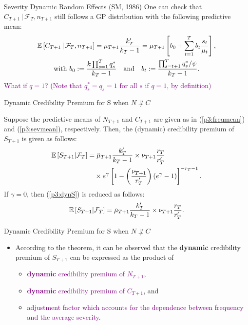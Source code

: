 \documentclass[ignorenonframetext,]{beamer}
\begin{document}
\begin{frame}{Severity Dynamic Random Effects (SM, 1986)}
One can check that $C_{T+1}\,|\,\mathcal{F}_T, n_{T+1}$ still follows a GP distribution with the following predictive mean:
\begin{equation}\label{p3:sevmean}
\begin{gathered}
{\mathbb E}\left[C_{T+1}\,|\,\mathcal{F}_T, n_{T+1}\right] = \mu_{T+1}\frac{k'_T}{k_T-1}
= \mu_{T+1}\left[b_0 + \sum_{t=1}^T b_t\frac{s_t}{\mu_t}\right], \\
\text{with } b_0 := \frac{k\prod_{s=1}^T q^*_s}{k_T-1} \quad \text{and} \quad
b_t := \frac{\prod_{s=t+1}^T q^*_s/\psi}{k_T-1}.
\end{gathered}
\end{equation}
\pause
\textcolor{purple}{What if $q=1$? (Note that $q^*_s=q_s=1$ for all $s$ if $q=1$, by definition)}
\end{frame}

\begin{frame}{Dynamic Credibility Premium for S when $N \not\perp C$}
\begin{theorem}
Suppose the predictive means of $N_{T+1}$ and $C_{T+1}$ are given as in (\ref{p3:freqmean}) and (\ref{p3:sevmean}), respectively.
Then, the (dynamic) credibility premium of $S_{T+1}$ is given as follows:
\begin{equation}\label{p3:dynS}
\begin{split}
{\mathbb E}\left[S_{T+1}|\mathcal{F}_T\right] &= \tilde{\mu}_{T+1}\frac{k'_T}{k_T-1} \times \nu_{T+1}\frac{r_T}{r'_T} \\
&\quad \times e^\gamma\left[1-\left(\frac{\nu_{T+1}}{r'_T}\right)(e^\gamma-1)\right]^{-r_T-1}.
\end{split}
\end{equation}
If $\gamma=0$, then (\ref{p3:dynS}) is reduced as follows:
$$
{\mathbb E}\left[S_{T+1}|\mathcal{F}_T\right] = \tilde{\mu}_{T+1}\frac{k'_T}{k_T-1} \times \nu_{T+1}\frac{r_T}{r'_T}.
$$
\end{theorem}
\end{frame}

\begin{frame}{Dynamic Credibility Premium for S when $N \not\perp C$}
\begin{itemize}
\item According to the theorem, it can be observed that the \textbf{dynamic} credibility premium of $S_{T+1}$ can be expressed as the product of
\begin{itemize}
\item \textcolor{purple}{\textbf{dynamic} credibility premium of $N_{T+1}$},
\item \textcolor{purple}{\textbf{dynamic} credibility premium of $C_{T+1}$}, and
\item \textcolor{purple}{adjustment factor which accounts for the dependence between frequency and the average severity.}
\end{itemize}
\end{itemize}
\end{frame}
\end{document}
